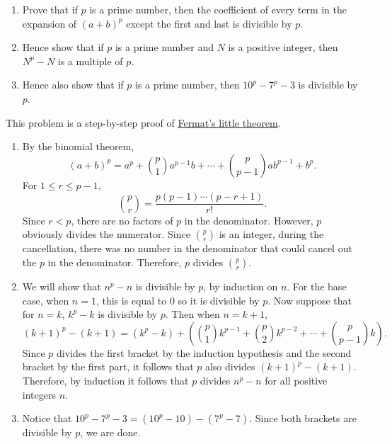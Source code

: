 \begin{question}
    \begin{enumerate}
        \item Prove that if $p$ is a prime number, then the coefficient of
            every term in the expansion of $(a + b)^p$ except the first and
            last is divisible by $p$. 
        
        \item Hence show that if $p$ is a prime number and $N$ is a positive
            integer, then $N^{p} - N$ is a multiple of $p$. 
        
        \item Hence also show that if $p$ is a prime number, then $10^p - 7^p -
            3$ is divisible by $p$. 
    \end{enumerate}
\end{question}
\begin{solution}
    This problem is a step-by-step proof of \hyperref[thm: FLT]{Fermat's little theorem}.
    \begin{enumerate}
        \item By the binomial theorem,
            \[ (a + b)^p = a^p + \binom{p}{1}a^{p - 1}b + \cdots + \binom{p}{p -
            1}ab^{p - 1} + b^p. \]
            For $1 \leq r \leq p - 1$,
            \[ \binom{p}{r} = \frac{p(p - 1) \cdots (p - r + 1)}{r!}. \]
            Since $r < p$, there are no factors of $p$ in the denominator. However,
            $p$ obviously divides the numerator. Since $\binom{p}{r}$ is an
            integer, during the cancellation, there was no number in the
            denominator that could cancel out the $p$ in the denominator.
            Therefore, $p$ divides $\binom{p}{r}$. 

        \item We will show that $n^p - n$ is divisible by $p$, by induction on
            $n$. For the base case, when $n = 1$, this is equal to 0 so it is
            divisible by $p$. Now suppose that for $n = k$, $k^p - k$ is
            divisible by $p$. Then when $n = k + 1$,
            \[ (k + 1)^p - (k + 1) = (k^p - k) + \left( \binom{p}{1}k^{p - 1} +
            \binom{p}{2}k^{p - 2} + \cdots + \binom{p}{p - 1}k \right).\]
            Since $p$ divides the first bracket by the induction hypothesis and
            the second bracket by the first part, it follows that $p$ also
            divides $(k + 1)^p - (k + 1)$. Therefore, by induction it follows
            that $p$ divides $n^p - n$ for all positive integers $n$.

        \item Notice that $10^p - 7^p - 3 = (10^p - 10) - (7^p - 7)$. Since
            both brackets are divisible by $p$, we are done. \qedhere
    \end{enumerate}
\end{solution}
